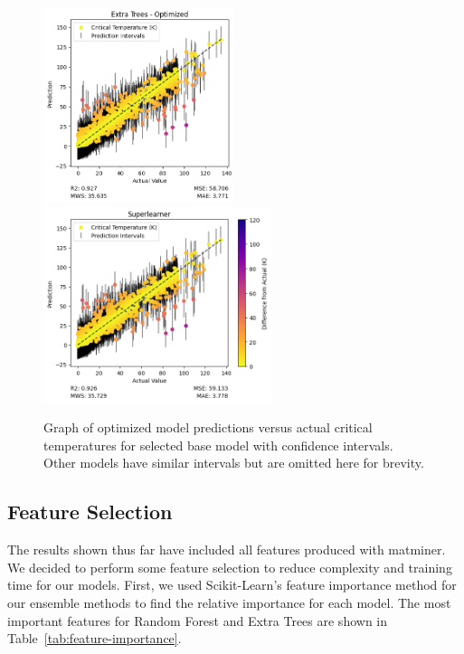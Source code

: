 \documentclass[twocolumn, nofootinbib, secnumarabic, amssymb, nobibnotes, aps, prd]{revtex4-2}
\begin{document}
\begin{figure}[!h]
    \includegraphics[height=2.25in]{images/subfigures/uncertainty/extra_trees_optimized.png}
    \includegraphics[height=2.25in]{images/subfigures/uncertainty/superlearner.png}
    \caption{Graph of optimized model predictions versus actual critical temperatures for selected base model with confidence intervals. Other models have similar intervals but are omitted here for brevity.}
    \label{fig:results-uncertainty}
\end{figure}%

\clearpage

\subsection{Feature Selection} %

The results shown thus far have included all features produced with matminer. We decided to perform some feature selection to reduce complexity and training time for our models. First, we used Scikit-Learn's feature importance method for our ensemble methods to find the relative importance for each model. The most important features for Random Forest and Extra Trees are shown in Table~\ref{tab:feature-importance}. 
\end{document}
